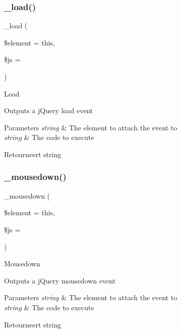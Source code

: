\subsubsection{\texorpdfstring{\_load()}{\_load()}}
{\footnotesize\ttfamily \+\_\+load (\begin{DoxyParamCaption}\item[{}]{\$element = {\ttfamily \textquotesingle{}this\textquotesingle{}},  }\item[{}]{\$js = {\ttfamily \textquotesingle{}\textquotesingle{}} }\end{DoxyParamCaption})\hspace{0.3cm}{\ttfamily [protected]}}

Load

Outputs a j\+Query load event


\begin{DoxyParams}{Parameters}
{\em string} & The element to attach the event to \\
\hline
{\em string} & The code to execute \\
\hline
\end{DoxyParams}
\begin{DoxyReturn}{Retourneert}
string 
\end{DoxyReturn}
\mbox{\label{class_c_i___jquery_a95cb3f44c2413b0fbe51734b346f4d92}} 
\subsubsection{\texorpdfstring{\_mousedown()}{\_mousedown()}}
{\footnotesize\ttfamily \+\_\+mousedown (\begin{DoxyParamCaption}\item[{}]{\$element = {\ttfamily \textquotesingle{}this\textquotesingle{}},  }\item[{}]{\$js = {\ttfamily \textquotesingle{}\textquotesingle{}} }\end{DoxyParamCaption})\hspace{0.3cm}{\ttfamily [protected]}}

Mousedown

Outputs a j\+Query mousedown event


\begin{DoxyParams}{Parameters}
{\em string} & The element to attach the event to \\
\hline
{\em string} & The code to execute \\
\hline
\end{DoxyParams}
\begin{DoxyReturn}{Retourneert}
string 
\end{DoxyReturn}
\mbox{\label{class_c_i___jquery_a8a575b3b64cda3a24434e8fed1553124}} 
